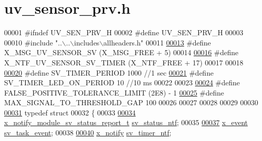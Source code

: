 \hypertarget{a00035_source}{\section{uv\+\_\+sensor\+\_\+prv.\+h}
\label{a00035_source}
}

\begin{DoxyCode}
00001 \textcolor{preprocessor}{#ifndef UV\_SEN\_PRV\_H}
00002 \textcolor{preprocessor}{#define UV\_SEN\_PRV\_H}
00003 
00010 \textcolor{preprocessor}{#include "..\(\backslash\)..\(\backslash\)includes\(\backslash\)allheaders.h"}
00011 
\hypertarget{a00035_source_l00013}{}\hyperlink{a00035_a88ce8cfec1a4d1cf613a890254880e24}{00013} \textcolor{preprocessor}{#define X\_MSG\_UV\_SENSOR\_SV                             (X\_MSG\_FREE + 5)}
00014 
\hypertarget{a00035_source_l00016}{}\hyperlink{a00035_a2ab2f7f60fff32ecaf2859625e76a868}{00016} \textcolor{preprocessor}{#define X\_NTF\_UV\_SENSOR\_SV\_TIMER                                   (X\_NTF\_FREE + 17)}
00017 
00018 
\hypertarget{a00035_source_l00020}{}\hyperlink{a00035_a8a535456285f4602701c814d7b69cc68}{00020} \textcolor{preprocessor}{#define SV\_TIMER\_PERIOD                             1000  //1 sec}
\hypertarget{a00035_source_l00021}{}\hyperlink{a00035_a44e4917fdf9d2a3574a3dd34537d97a7}{00021} \textcolor{preprocessor}{#define SV\_TIMER\_LED\_ON\_PERIOD                              10    //10 ms}
00022 
00023 
\hypertarget{a00035_source_l00024}{}\hyperlink{a00035_aa88a423475bb5b13601785eed80fb1b9}{00024} \textcolor{preprocessor}{#define FALSE\_POSITIVE\_TOLERANCE\_LIMIT                              (2E8) - 1}
\hypertarget{a00035_source_l00025}{}\hyperlink{a00035_a4131fea6179b36b90522dd6a9ecc0a73}{00025} \textcolor{preprocessor}{#define MAX\_SIGNAL\_TO\_THRESHOLD\_GAP                                 100}
00026 
00027 
00028 
00029 
00030 
\hypertarget{a00035_source_l00031}{}\hyperlink{a00035}{00031} \textcolor{keyword}{typedef} \textcolor{keyword}{struct}
00032 \{
00033 
\hypertarget{a00035_source_l00034}{}\hyperlink{a00035_afdc0e2c51e8e301d264700f4f9c10740}{00034}      \hyperlink{a00021_d7/d1b/a00864}{x\_notify\_module\_sv\_status\_report\_t}          
      \hyperlink{a00035_afdc0e2c51e8e301d264700f4f9c10740}{sv\_status\_ntf};
00035 
\hypertarget{a00035_source_l00037}{}\hyperlink{a00035_a43c345f39ea3aefbb60ef1ef57fe5d83}{00037}       \hyperlink{a00036_de/d37/a00849}{x\_event}                         \hyperlink{a00035_a43c345f39ea3aefbb60ef1ef57fe5d83}{sv\_task\_event};
00038 
\hypertarget{a00035_source_l00040}{}\hyperlink{a00035_ada91b200053f2d93e3639dc4ee3415b4}{00040}       \hyperlink{a00036_df/d4c/a00851}{x\_notify}                                   \hyperlink{a00035_ada91b200053f2d93e3639dc4ee3415b4}{sv\_timer\_ntf};

\end{DoxyCode}
